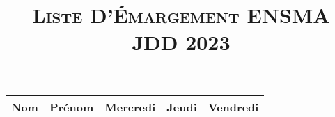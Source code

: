 \documentclass[13pt, french, a4paper]{article}
\title{\textsc{Liste D'Émargement ENSMA JDD 2023}}
\date{\vspace{-10ex}}
\begin{document}
\maketitle

\begin{longtable}{|p{5cm}|p{4cm}|p{2cm}|p{2cm}|p{2cm}|}
    \hline
    \Large \textbf{Nom} & \Large \textbf{Prénom} & \large \textbf{Mercredi} &  \large \textbf{Jeudi} & \large \textbf{Vendredi} \\
    \hline
    
\end{longtable}
\end{document}
